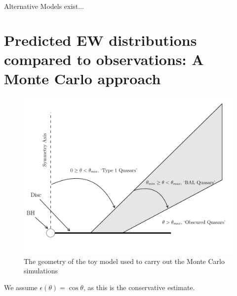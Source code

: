 Alternative Models exist...






\section{Predicted EW distributions compared to observations: A Monte Carlo approach}

\begin{figure}
\centering
\includegraphics[width=1.0\textwidth]{figures/ewpaper/fig2_cartoon.png}
\caption
{
The geometry of the toy model used to carry out the Monte Carlo simulations
}
\label{fig:cartoon}
\end{figure}


We assume
$\epsilon(\theta) = \cos \theta$, as this is the conservative estimate. 

